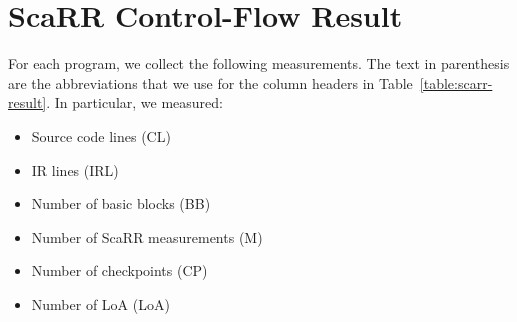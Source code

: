 \section{ScaRR Control-Flow Result}

For each program, we collect the following measurements. The text in parenthesis
are the abbreviations that we use for the column headers in
Table~\ref{table:scarr-result}.
In particular, we measured:
\begin{itemize}
    \item Source code lines (CL)
    \item IR lines (IRL)
    \item Number of basic blocks (BB)
    \item Number of ScaRR measurements (M)
    \item Number of checkpoints (CP)
    \item Number of LoA (LoA)
\end{itemize}



